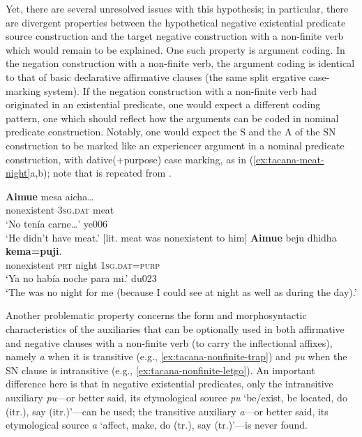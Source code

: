 \documentclass[output=paper]{langsci/langscibook}
\begin{document}
Yet, there are several unresolved issues with this hypothesis; in
particular, there are divergent properties between the hypothetical
negative existential predicate source construction and the target negative
construction with a non-finite verb which would remain to be explained.
One such property is argument coding.  In the negation construction with a
non-finite verb, the argument coding is identical to that of basic
declarative affirmative clauses (the same split ergative case-marking
system). If the negation construction with a
non-finite verb had originated in an existential predicate, one would
expect a different coding pattern, one which should reflect how the
arguments can be coded in nominal predicate construction. Notably, one
would expect the S and the A of the SN construction to be marked like an
experiencer argument in a nominal predicate construction, with
dative(+purpose) case marking, as in (\ref{ex:tacana-meat-night}a,b);
note that  is repeated from .
%
\begin{exe}\ex\label{ex:tacana-meat-night}
\begin{xlist}
\ex\label{ex:tacana-still-no-meat}
\gll {}\textbf{Aimue} mesa aicha…\\
    nonexistent  \textsc{3sg.dat}  meat\\
\glt `No tenía carne…' ye006\\
`He didn't have meat.' [lit. meat was nonexistent to him]
\ex\label{ex:tacana-no-night}
\gll  \textbf{Aimue}  beju  dhidha  \textbf{kema=puji}.\\
    nonexistent  \textsc{prt}  night  1\textsc{sg.dat=purp}\\
\glt `Ya no había noche para mi.' du023\\
`The was no night for me (because I could see at night as well as during the day).'
\end{xlist}\end{exe}

Another problematic property concerns the form and morphosyntactic
characteristics of the auxiliaries that can be optionally used in both
affirmative and negative clauses with a non-finite verb (to carry the
inflectional affixes), namely \textit{a} when it is transitive (e.g.,
\ref{ex:tacana-nonfinite-trap}) and \textit{pu} when the SN clause is
intransitive (e.g., \ref{ex:tacana-nonfinite-letgo}). An important difference here is that in negative existential predicates, only the intransitive auxiliary \textit{pu}—or better said, its etymological source \textit{pu} ‘be/exist, be located, do (itr.), say (itr.)’—can be used; the transitive auxiliary\textit{ a}—or better said, its etymological source \textit{a }‘affect, make, do (tr.), say (tr.)’—is never found.
\end{document}
